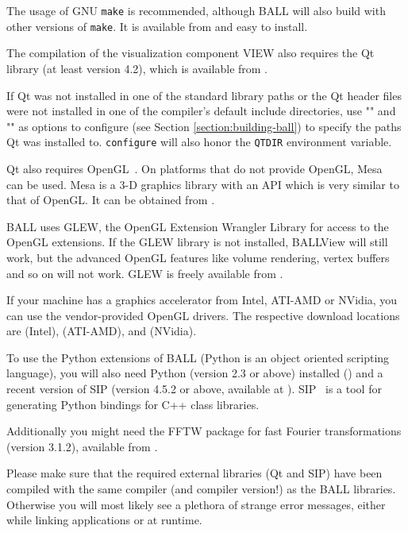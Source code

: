 The usage of GNU {\tt make} is recommended, although BALL will also build with
other versions of {\tt make}. It is available from 
and easy to install.

The compilation of the visualization component VIEW also requires the Qt 
library (at least version 4.2), which is available from
.

If Qt was not installed in one of the standard library paths or the
Qt header files were not installed in one of the compiler's default
include directories, use \mbox{""} and
\mbox{""} as options to configure (see
Section \ref{section:building-ball}) to specify the paths Qt was installed
to. {\tt configure} will also honor the {\tt QTDIR} environment variable.

Qt also requires OpenGL~\cite{OpenGL}. On platforms that do not provide OpenGL,
Mesa~\cite{Mesa} can be used. Mesa is a 3-D graphics library with an API which
is very similar to that of OpenGL. It can be obtained from 
.

BALL uses GLEW, the OpenGL Extension Wrangler Library for access to the OpenGL
extensions. If the GLEW library is not installed, BALLView will still work, but
the advanced OpenGL features like volume rendering, vertex buffers and so on
will not work. GLEW is freely available from .

If your machine has a graphics accelerator from Intel, ATI-AMD or NVidia, you
can use the vendor-provided OpenGL drivers. The respective download locations
are  (Intel),
 (ATI-AMD), and
 (NVidia).

To use the Python extensions of BALL (Python is an object oriented scripting
language), you will also need Python (version 2.3 or above) installed
() and a recent version of SIP (version 4.5.2 or
above, available at ).
SIP~\cite{SIP} is a tool for generating Python bindings for C++ class libraries.

Additionally you might need the FFTW package for fast Fourier transformations
(version 3.1.2), available from .

Please make sure that the required external \CPP libraries (\ie Qt and SIP)
have been compiled with the same compiler (and compiler version!) as the BALL
libraries. Otherwise you will most likely see a plethora of strange error
messages, either while linking applications or at runtime.

